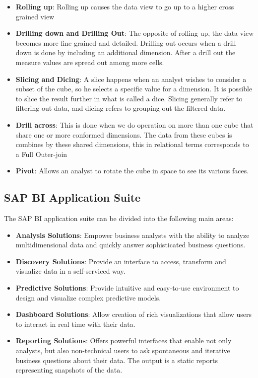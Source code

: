 \begin{itemize}
	\item \textbf{Rolling up}: Rolling up causes the data view to go up to a higher cross grained view
	\item \textbf{Drilling down and Drilling Out}: The opposite of rolling up, the data view becomes more fine grained and detailed. Drilling out occurs when a drill down is done by including an additional dimension. After a drill out the measure values are spread out among more cells.
	\item \textbf{Slicing and Dicing}: A slice happens when an analyst wishes to consider a subset of the cube, so he selects a specific value for a dimension. It is possible to slice the result further in what is called a dice. Slicing generally refer to filtering out data, and dicing refers to grouping out the filtered data.
	\item \textbf{Drill across}: This is done when we do operation on more than one cube that share one or more conformed dimensions. The data from these cubes is combines by these shared dimensions, this in relational terms corresponds to a Full Outer-join
	\item \textbf{Pivot}: Allows an analyst to rotate the cube in space to see its various faces.
\end{itemize}

\subsection{SAP BI Application Suite}

The SAP BI application suite can be divided into the following main areas:

\begin{itemize}
	\item \textbf{Analysis Solutions}: Empower business analysts with the ability to analyze multidimensional data and quickly answer sophisticated business questions.
	\item \textbf{Discovery Solutions}: Provide an interface to access, transform and visualize data in a self-serviced way.
	\item \textbf{Predictive Solutions}: Provide intuitive and easy-to-use environment to design and visualize complex predictive models.
	\item \textbf{Dashboard Solutions}: Allow creation of rich visualizations that allow users to interact in real time with their data.
	\item \textbf{Reporting Solutions}: Offers powerful interfaces that enable not only analysts, but also non-technical users to ask spontaneous and iterative business questions about their data. The output is a static reports representing snapshots of the data.
\end{itemize}


